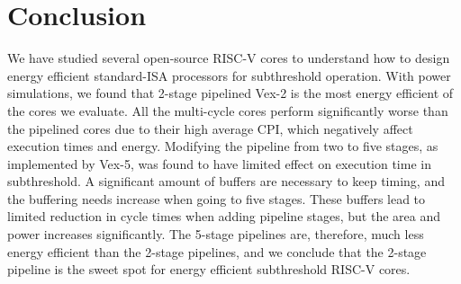 \section{Conclusion}

We have studied several open-source RISC-V cores to understand how to design energy efficient standard-ISA processors for subthreshold operation.
With power simulations, we found that 2-stage pipelined Vex-2 is the most energy efficient of the cores we evaluate.
All the multi-cycle cores perform significantly worse than the pipelined cores due to their high average CPI, which negatively affect execution times and energy. 
Modifying the pipeline from two to five stages, as implemented by Vex-5, was found to have limited effect on execution time in subthreshold.  A significant amount of buffers are necessary to keep timing, and the buffering needs increase when going to five stages.  These buffers lead to limited reduction in cycle times when adding pipeline stages, but the area and power increases significantly. The 5-stage pipelines are, therefore, much less energy efficient than the 2-stage pipelines, and we conclude that the 2-stage pipeline is the sweet spot for  energy efficient subthreshold RISC-V cores.
